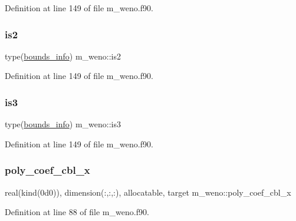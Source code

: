 Definition at line 149 of file m\+\_\+weno.\+f90.

\mbox{\label{namespacem__weno_aceec79b8e24447024e5ccbc46f42300f}} 
\subsubsection{\texorpdfstring{is2}{is2}}
{\footnotesize\ttfamily type(\hyperlink{structm__derived__types_1_1bounds__info}{bounds\+\_\+info}) m\+\_\+weno\+::is2}



Definition at line 149 of file m\+\_\+weno.\+f90.

\mbox{\label{namespacem__weno_a705812a0239b1d121413020e61ef25bc}} 
\subsubsection{\texorpdfstring{is3}{is3}}
{\footnotesize\ttfamily type(\hyperlink{structm__derived__types_1_1bounds__info}{bounds\+\_\+info}) m\+\_\+weno\+::is3}



Definition at line 149 of file m\+\_\+weno.\+f90.

\mbox{\label{namespacem__weno_a213b935ef0b013f9e7fd5ebe10b9a4c8}} 
\subsubsection{\texorpdfstring{poly\+\_\+coef\+\_\+cbl\+\_\+x}{poly\_coef\_cbl\_x}}
{\footnotesize\ttfamily real(kind(0d0)), dimension(\+:,\+:,\+:), allocatable, target m\+\_\+weno\+::poly\+\_\+coef\+\_\+cbl\+\_\+x}



Definition at line 88 of file m\+\_\+weno.\+f90.

\mbox{\label{namespacem__weno_aa1d7ef08c1ddba26e1fa12f287c810fa}} 
